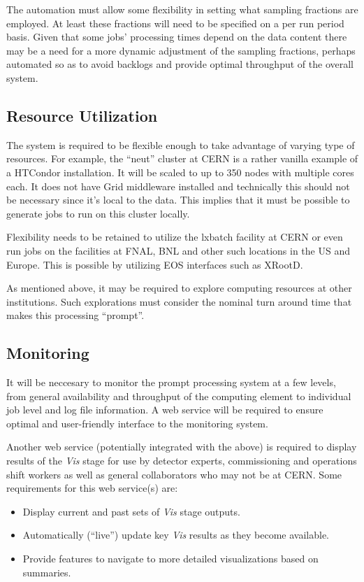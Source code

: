 \documentclass[pdftex,12pt,letter]{article}
\begin{document}
The automation must allow some flexibility in setting what
sampling fractions are employed.  At least these
fractions will need to be specified on a per run period basis.  Given
that some jobs' processing times depend on the data content there may
be a need for a more dynamic adjustment of the sampling fractions, perhaps
automated so as to avoid backlogs and provide optimal throughput of the
overall system.

\subsection{Resource Utilization}
The system is required to be flexible enough to take advantage of varying type of resources. For example, the ``neut'' cluster at CERN
is a rather vanilla example of a HTCondor installation. It will be scaled to up to 350 nodes with multiple cores each. It does not have Grid middleware
installed and technically this should not be necessary since it's local to the data. This implies that it must be possible to generate jobs to
run on this cluster locally.

Flexibility needs to be retained to utilize the lxbatch facility at CERN or even run jobs on the facilities at FNAL, BNL and other such locations
in the US and Europe. This is possible by utilizing EOS interfaces such as XRootD.

As mentioned above, it may be required to explore computing resources
at other institutions.  Such explorations must consider the nominal
turn around time that makes this processing ``prompt''.

\subsection{Monitoring}
It will be neccesary to monitor the prompt processing system at a few
levels, from general availability and throughput of the computing
element to individual job level and log file information.  A web
service will be required to ensure optimal and user-friendly interface
to the monitoring system.

Another web service (potentially integrated with the above) is
required to display results of the \textit{Vis} stage for use by
detector experts, commissioning and operations shift workers as well
as general collaborators who may not be at CERN.  Some requirements
for this web service(s) are:

\begin{itemize}
\item Display current and past sets of \textit{Vis} stage outputs.
\item Automatically (``live'') update key \textit{Vis} results as they become available.
\item Provide features to navigate to more detailed visualizations based on summaries.
\end{itemize}
\end{document}
